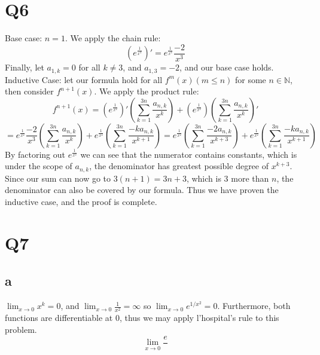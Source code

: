 \documentclass[12pt]{article}
\newcommand{\N}{\mathbb{N}}
\begin{document}
\section{Q6}
Base case: $n=1$. We apply the chain rule:
$$(e^{\frac{1}{x^2}})' = e^{\frac{1}{x^2}}\frac{-2}{x^3}$$
Finally, let $a_{1,k} = 0$ for all $k \not = 3$, and $a_{1,3}=-2$, and our base case holds.
\newline
Inductive Case: let our formula hold for all $f^m(x) (m \leq n)$ for some $n \in \N$, then consider $f^{n+1}(x)$. We apply the product rule:
$$f^{n+1}(x) = (e^{\frac{1}{x^2}})'(\sum_{k=1}^{3n}\frac{a_{n,k}}{x^k}) + (e^{\frac{1}{x^2}})(\sum_{k=1}^{3n}\frac{a_{n,k}}{x^k})'$$
$$= e^{\frac{1}{x^2}}\frac{-2}{x^3}(\sum_{k=1}^{3n}\frac{a_{n,k}}{x^k}) + e^{\frac{1}{x^2}}(\sum_{k=1}^{3n}\frac{-ka_{n,k}}{x^{k+1}})
= e^{\frac{1}{x^2}}(\sum_{k=1}^{3n}\frac{-2a_{n,k}}{x^{k+3}}) + e^{\frac{1}{x^2}}(\sum_{k=1}^{3n}\frac{-ka_{n,k}}{x^{k+1}})$$
By factoring out $e^{\frac{1}{x^2}}$ we can see that the numerator contains constants, which is under the scope of $a_{n,k}$, the denominator has greatest possible degree of $x^{k+3}$. Since our sum can now go to $3(n+1) = 3n+3$, which is $3$ more than $n$, the denominator can also be covered by our formula.
\newline
Thus we have proven the inductive case, and the proof is complete.
\newpage


\section{Q7}
\subsection{a}
$\lim_{x \to 0} x^k = 0$, and $\lim_{x \to 0} \frac{1}{x^2} = \infty$ so $\lim_{x \to 0} e^{1/x^2} = 0$. Furthermore, both functions are differentiable at $0$, thus we may apply l'hospital's rule to this problem.
$$\lim_{x \to 0} \frac{e^{}}{}$$
\end{document}

